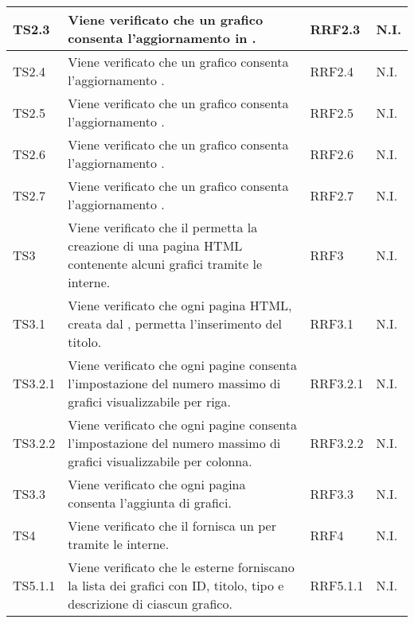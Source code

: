 \begin{longtabu}{| X[0.5] | X | X[0.5] | X[0.4] |}
TS2.3 & Viene verificato che un grafico  consenta l'aggiornamento in . & RRF2.3 & N.I.\\ \hline

TS2.4 & Viene verificato che un grafico  consenta l'aggiornamento . & RRF2.4 & N.I.\\ \hline

TS2.5 & Viene verificato che un grafico  consenta l'aggiornamento . & RRF2.5 & N.I.\\ \hline

TS2.6 & Viene verificato che un grafico  consenta l'aggiornamento . & RRF2.6 & N.I.\\ \hline

TS2.7 & Viene verificato che un grafico  consenta l'aggiornamento . & RRF2.7 & N.I.\\ \hline

TS3 & Viene verificato che il  permetta la creazione di una pagina HTML contenente alcuni grafici tramite le  interne. & RRF3 & N.I.\\ \hline

TS3.1 & Viene verificato che ogni pagina HTML, creata dal , permetta l'inserimento del titolo. & RRF3.1 & N.I.\\ \hline

TS3.2.1 & Viene verificato che ogni pagine consenta l'impostazione del numero massimo di grafici visualizzabile per riga. & RRF3.2.1 & N.I.\\ \hline

TS3.2.2 & Viene verificato che ogni pagine consenta l'impostazione del numero massimo di grafici visualizzabile per colonna. & RRF3.2.2 & N.I.\\ \hline

TS3.3 & Viene verificato che ogni pagina consenta l'aggiunta di grafici. & RRF3.3 & N.I.\\ \hline

TS4 & Viene verificato che il  fornisca un  per  tramite le  interne. & RRF4 & N.I.\\ \hline

TS5.1.1 & Viene verificato che le  esterne forniscano la lista dei grafici con ID, titolo, tipo e descrizione di ciascun grafico. & RRF5.1.1 & N.I.\\ \hline


\end{longtabu}
